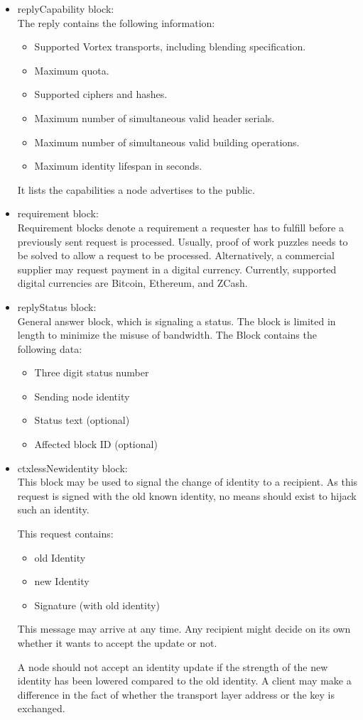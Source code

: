 \begin{itemize}
	\item replyCapability block:\\
	The reply contains the following information:
	\begin{itemize}
		\item Supported Vortex transports, including blending specification.
		\item Maximum quota.
		\item Supported ciphers and hashes.
		\item Maximum number of simultaneous valid header serials.
		\item Maximum number of simultaneous valid building operations.
		\item Maximum identity lifespan in seconds.
	\end{itemize}
	It lists the capabilities a node advertises to the public. 
	
	\item requirement block:\\
	Requirement blocks denote a requirement a requester has to fulfill before a previously sent request is processed. Usually, proof of work puzzles needs to be solved to allow a request to be processed. Alternatively, a commercial supplier may request payment in a digital currency. Currently, supported digital currencies are Bitcoin, Ethereum, and ZCash.
	
	\item replyStatus block:\\
	General answer block, which is signaling a status. The block is limited in length to minimize the misuse of bandwidth. The Block contains the following data:
	\begin{itemize}
		\item Three digit status number
		\item Sending node identity
		\item Status text (optional)
		\item Affected block ID (optional)
	\end{itemize}
	
	\item ctxlessNewidentity block:\\
	This block may be used to signal the change of identity to a recipient. As this request is signed with the old known identity, no means should exist to hijack such an identity.
	
	This request contains:
	\begin{itemize}
		\item old Identity
		\item new Identity
		\item Signature (with old identity)
	\end{itemize}
	
	This message may arrive at any time. Any recipient might decide on its own whether it wants to accept the update or not.
	
	A node should not accept an identity update if the strength of the new identity has been lowered compared to the old identity. A client may make a difference in the fact of whether the transport layer address or the key is exchanged. 
\end{itemize}
